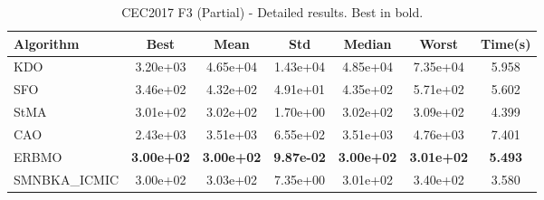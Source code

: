 \begin{table}[H]
\centering\small
\caption{CEC2017 F3 (Partial) - Detailed results. Best in bold.}
\label{tab:cec2017_F3}
\begin{tabular}{lcccccc}
\toprule
\textbf{Algorithm} & \textbf{Best} & \textbf{Mean} & \textbf{Std} & \textbf{Median} & \textbf{Worst} & \textbf{Time(s)} \\
\midrule
KDO & 3.20e+03 & 4.65e+04 & 1.43e+04 & 4.85e+04 & 7.35e+04 & 5.958 \\
SFO & 3.46e+02 & 4.32e+02 & 4.91e+01 & 4.35e+02 & 5.71e+02 & 5.602 \\
StMA & 3.01e+02 & 3.02e+02 & 1.70e+00 & 3.02e+02 & 3.09e+02 & 4.399 \\
CAO & 2.43e+03 & 3.51e+03 & 6.55e+02 & 3.51e+03 & 4.76e+03 & 7.401 \\
ERBMO & \textbf{3.00e+02} & \textbf{3.00e+02} & \textbf{9.87e-02} & \textbf{3.00e+02} & \textbf{3.01e+02} & \textbf{5.493} \\
SMNBKA_ICMIC & 3.00e+02 & 3.03e+02 & 7.35e+00 & 3.01e+02 & 3.40e+02 & 3.580 \\
\bottomrule
\end{tabular}
\end{table}
